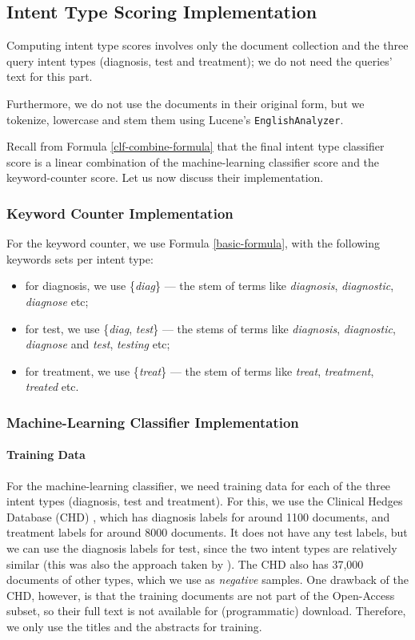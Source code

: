\subsection{Intent Type Scoring Implementation}
Computing intent type scores involves only the document collection and the three query intent types (diagnosis, test and treatment);
we do not need the queries' text for this part.

Furthermore, we do not use the documents in their original form,
but we tokenize, lowercase and stem them using Lucene's \texttt{EnglishAnalyzer}.

Recall from Formula \ref{clf-combine-formula} that the final intent type classifier score is a linear combination of the
machine-learning classifier score and the keyword-counter score. Let us now discuss their implementation.

\subsubsection{Keyword Counter Implementation}
For the keyword counter, we use Formula \ref{basic-formula}, with the following keywords sets per intent type:
\begin{itemize}
 \item for diagnosis, we use \{\emph{diag}\} --- the stem of terms like \emph{diagnosis}, \emph{diagnostic}, \emph{diagnose} etc;
 \item for test, we use \{\emph{diag}, \emph{test}\} --- the stems of terms like \emph{diagnosis}, \emph{diagnostic}, \emph{diagnose} and
 \emph{test}, \emph{testing} etc;
 \item for treatment, we use \{\emph{treat}\} --- the stem of terms like \emph{treat}, \emph{treatment}, \emph{treated} etc.
\end{itemize}

\subsubsection{Machine-Learning Classifier Implementation}
\paragraph{Training Data}
For the machine-learning classifier, we need training data for each of the three intent types (diagnosis, test and treatment).
For this, we use the Clinical Hedges Database (CHD)
\cite{chd},
which has diagnosis labels for around 1100 documents, and treatment labels for around 8000 documents. It does
not have any test labels, but we can use the diagnosis labels for test, since the two intent types are relatively similar
(this was also the approach taken by \cite{choi}).
The CHD also has 37,000 documents of other types, which we use as \emph{negative} samples.
One drawback of the CHD, however, is that the training documents are not part of the Open-Access subset, so their full text is not
available for (programmatic) download. Therefore, we only use the titles and the abstracts for training.

